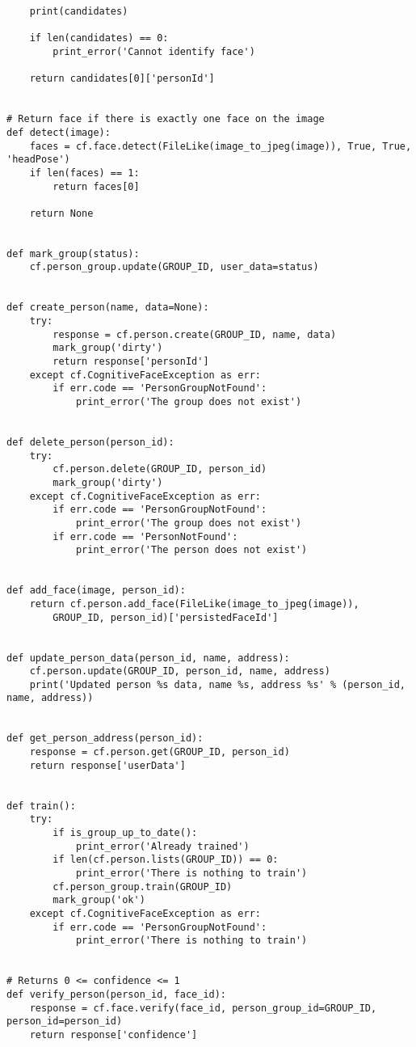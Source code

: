 \begin{verbatim}
    print(candidates)

    if len(candidates) == 0:
        print_error('Cannot identify face')

    return candidates[0]['personId']


# Return face if there is exactly one face on the image
def detect(image):
    faces = cf.face.detect(FileLike(image_to_jpeg(image)), True, True, 'headPose')
    if len(faces) == 1:
        return faces[0]

    return None


def mark_group(status):
    cf.person_group.update(GROUP_ID, user_data=status)


def create_person(name, data=None):
    try:
        response = cf.person.create(GROUP_ID, name, data)
        mark_group('dirty')
        return response['personId']
    except cf.CognitiveFaceException as err:
        if err.code == 'PersonGroupNotFound':
            print_error('The group does not exist')


def delete_person(person_id):
    try:
        cf.person.delete(GROUP_ID, person_id)
        mark_group('dirty')
    except cf.CognitiveFaceException as err:
        if err.code == 'PersonGroupNotFound':
            print_error('The group does not exist')
        if err.code == 'PersonNotFound':
            print_error('The person does not exist')


def add_face(image, person_id):
    return cf.person.add_face(FileLike(image_to_jpeg(image)), 
        GROUP_ID, person_id)['persistedFaceId']


def update_person_data(person_id, name, address):
    cf.person.update(GROUP_ID, person_id, name, address)
    print('Updated person %s data, name %s, address %s' % (person_id, name, address))


def get_person_address(person_id):
    response = cf.person.get(GROUP_ID, person_id)
    return response['userData']


def train():
    try:
        if is_group_up_to_date():
            print_error('Already trained')
        if len(cf.person.lists(GROUP_ID)) == 0:
            print_error('There is nothing to train')
        cf.person_group.train(GROUP_ID)
        mark_group('ok')
    except cf.CognitiveFaceException as err:
        if err.code == 'PersonGroupNotFound':
            print_error('There is nothing to train')


# Returns 0 <= confidence <= 1
def verify_person(person_id, face_id):
    response = cf.face.verify(face_id, person_group_id=GROUP_ID, person_id=person_id)
    return response['confidence']
\end{verbatim}

